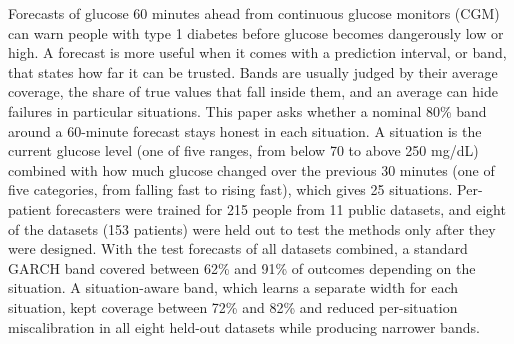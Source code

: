Forecasts of glucose 60 minutes ahead from continuous glucose monitors (CGM) can warn people with type 1 diabetes before glucose becomes dangerously low or high. A forecast is more useful when it comes with a prediction interval, or band, that states how far it can be trusted. Bands are usually judged by their average coverage, the share of true values that fall inside them, and an average can hide failures in particular situations. This paper asks whether a nominal 80\% band around a 60-minute forecast stays honest in each situation. A situation is the current glucose level (one of five ranges, from below 70 to above 250 mg/dL) combined with how much glucose changed over the previous 30 minutes (one of five categories, from falling fast to rising fast), which gives 25 situations. Per-patient forecasters were trained for 215 people from 11 public datasets, and eight of the datasets (153 patients) were held out to test the methods only after they were designed. With the test forecasts of all datasets combined, a standard GARCH band covered between 62\% and 91\% of outcomes depending on the situation. A situation-aware band, which learns a separate width for each situation, kept coverage between 72\% and 82\% and reduced per-situation miscalibration in all eight held-out datasets while producing narrower bands.
